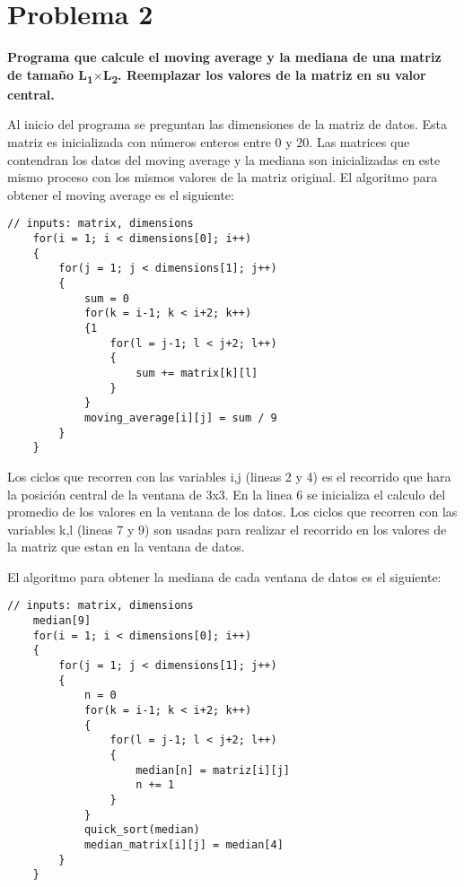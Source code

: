 \section*{Problema 2}

\textbf{Programa que calcule el moving average y la mediana de una matriz de tamaño L\textsubscript{1}$\mathbf{\times}$L\textsubscript{2}. Reemplazar los valores de la matriz en su valor central.}

Al inicio del programa se preguntan las dimensiones de la matriz de datos. Esta matriz es inicializada con números enteros entre 0 y 20. Las matrices que contendran los datos del moving average y la mediana son inicializadas en este mismo proceso con los mismos valores de la matriz original. El algoritmo para obtener el moving average es el siguiente:

\begin{lstlisting}[style=CStyle]
    // inputs: matrix, dimensions
    for(i = 1; i < dimensions[0]; i++)
    {
        for(j = 1; j < dimensions[1]; j++)
        {
            sum = 0
            for(k = i-1; k < i+2; k++)
            {1
                for(l = j-1; l < j+2; l++)
                {
                    sum += matrix[k][l]
                }
            }
            moving_average[i][j] = sum / 9
        }
    }
\end{lstlisting}

Los ciclos que recorren con las variables i,j (lineas 2 y 4) es el recorrido que hara la posición central de la ventana de 3x3. En la linea 6 se inicializa el calculo del promedio de los valores en la ventana de los datos. Los ciclos que recorren con las variables k,l (lineas 7 y 9) son usadas para realizar el recorrido en los valores de la matriz que estan en la ventana de datos.

El algoritmo para obtener la mediana de cada ventana de datos es el siguiente:

\begin{lstlisting}[style=CStyle]
    // inputs: matrix, dimensions
    median[9]
    for(i = 1; i < dimensions[0]; i++)
    {
        for(j = 1; j < dimensions[1]; j++)
        {
            n = 0
            for(k = i-1; k < i+2; k++)
            {
                for(l = j-1; l < j+2; l++)
                {
                    median[n] = matriz[i][j]
                    n += 1
                }
            }
            quick_sort(median)
            median_matrix[i][j] = median[4]
        }
    }
\end{lstlisting}

